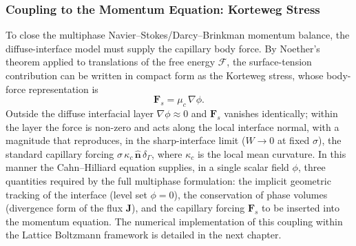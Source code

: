 \subsubsection{Coupling to the Momentum Equation: Korteweg Stress}

To close the multiphase Navier--Stokes/Darcy--Brinkman momentum balance, the diffuse-interface model must supply the capillary body force.
By Noether's theorem applied to translations of the free energy $\mathcal{F}$, the surface-tension contribution can be written in compact form as the Korteweg stress, whose body-force representation is
\begin{equation}
    \mathbf{F}_s = \mu_c\,\nabla \phi.
\end{equation}
Outside the diffuse interfacial layer $\nabla \phi \approx 0$ and $\mathbf{F}_s$ vanishes identically;
within the layer the force is non-zero and acts along the local interface normal, with a magnitude that reproduces, in the sharp-interface limit ($W \to 0$ at fixed $\sigma$), the standard capillary forcing $\sigma\,\kappa_c\,\hat{\mathbf{n}}\,\delta_{\Gamma}$, where $\kappa_c$ is the local mean curvature.
In this manner the Cahn--Hilliard equation supplies, in a single scalar field $\phi$, three quantities required by the full multiphase formulation: the implicit geometric tracking of the interface (level set $\phi = 0$), the conservation of phase volumes (divergence form of the flux $\mathbf{J}$), and the capillary forcing $\mathbf{F}_s$ to be inserted into the momentum equation.
The numerical implementation of this coupling within the Lattice Boltzmann framework is detailed in the next chapter.

